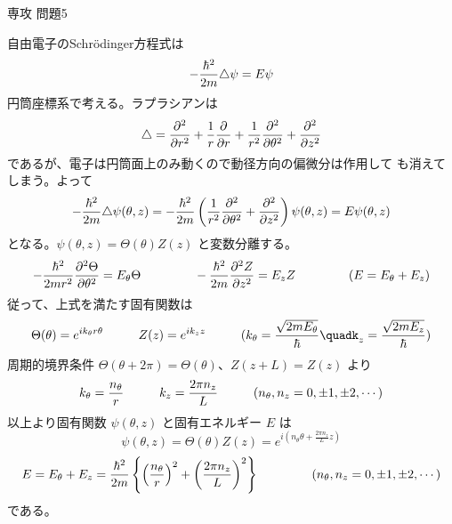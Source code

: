 \documentclass[fleqn]{jbook}
\begin{document}
\begin{answer}{専攻 問題5}{}

\begin{subanswers}
\SubAnswer
  \begin{subsubanswers}
  \SubSubAnswer
    自由電子のSchr\"{o}dinger方程式は
%
    \[ -\frac{\hbar^2}{2m} \triangle \psi= E\psi \]
%
    円筒座標系で考える。ラプラシアンは
%
    \[ \Laplacian = \Partial{^2}{r^2} + \frac{1}{r}\Partial{}{r}%
                  + \frac{1}{r^2}\Partial{^2}{\theta^2}%
                  + \Partial{^2}{z^2} \]
%
    であるが、電子は円筒面上のみ動くので動径方向の偏微分は作用して
    も消えてしまう。よって
%
    \[ -\frac{\hbar^2}{2m} \Laplacian \psi(\theta,z)%
       = -\frac{\hbar^2}{2m} \left(%
           \frac{1}{r^2}\Partial{^2}{\theta^2}+\Partial{^2}{z^2}%
         \right) \psi(\theta,z) = E \psi(\theta,z) \]
%
    となる。$\psi(\theta,z)=\Theta(\theta)Z(z)$ と変数分離する。
%
    \[ -\frac{\hbar^2}{2mr^2} \Partial{^2\Theta}{\theta^2}%
        = E_\theta\Theta \hspace{15mm}%
       -\frac{\hbar^2}{2m}\Partial{^2Z}{z^2}%
        = E_z Z \hspace{15mm}%
        ( E = E_\theta+E_z ) \]
%
    従って、上式を満たす固有関数は
%
    \[ \Theta(\theta) = e^{ik_\theta r\theta} \hspace{10mm}%
       Z(z)           = e^{ik_zz} \hspace{10mm}%
       (k_\theta=\frac{\sqrt{2mE_\theta}}{\hbar} \quad%
        k_z=\frac{\sqrt{2mE_z}}{\hbar}) \]
%
    周期的境界条件 $\Theta(\theta+2\pi)=\Theta(\theta)$、$Z(z+L)=Z(z)$
    より
%
    \[ k_\theta=\frac{n_\theta}{r} \hspace{10mm}%
       k_z     =\frac{2\pi n_z}{L} \hspace{10mm}%
       (n_\theta,n_z=0,\pm 1,\pm 2,\cdots) \]
%
    以上より固有関数 $\psi(\theta,z)$ と固有エネルギー $E$ は
%
    \[ \psi(\theta,z) = \Theta(\theta)Z(z)%
                      = e^{i(n_\theta\theta+\frac{2\pi n_z}{L}z)} \]
    \[ E = E_\theta+E_z%
         = \frac{\hbar^2}{2m} \left\{%
             \left(\frac{n_\theta}{r}\right)^2%
            +\left(\frac{2\pi n_z}{L}\right)^2%
           \right\} \hspace{15mm}%
           (n_\theta,n_z=0,\pm 1,\pm 2,\cdots) \]
%
    である。



\end{subsubanswers}
\end{subanswers}
\end{answer}
\end{document}
